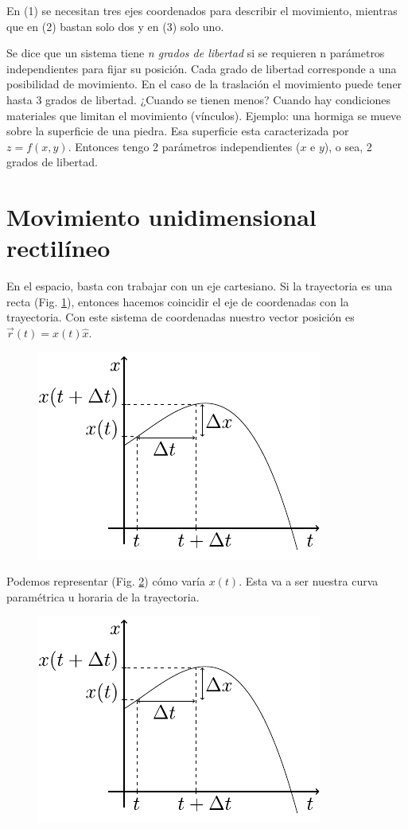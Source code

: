 En (1) se necesitan tres ejes coordenados para describir el movimiento, mientras que en (2) bastan solo dos y en (3) 
solo uno.

\para
Se dice que un sistema tiene \textit{n grados de libertad} si se requieren n parámetros independientes para fijar su 
posición. Cada grado de libertad corresponde a una posibilidad de movimiento. En el caso de la traslación el movimiento 
puede tener hasta 3 grados de libertad.
¿Cuando se tienen menos? Cuando hay condiciones materiales que limitan el movimiento (vínculos). Ejemplo: una hormiga 
se mueve sobre la superficie de una piedra. Esa superficie esta caracterizada por $z=f(x,y)$. Entonces tengo 2 
parámetros independientes ($x$ e $y$), o sea, 2 grados de libertad.

\section{Movimiento unidimensional rectilíneo}
En el espacio, basta con trabajar con un eje cartesiano. Si la trayectoria es una recta (Fig. \ref{fig:1-5}), 
entonces hacemos coincidir el eje de coordenadas con la trayectoria. Con este sistema de coordenadas nuestro vector 
posición es $\vec{r}(t) = x(t)\hat{x}$.
\begin{figure}[htbp]
  \centering
  \includegraphics[]{images/f1-6.pdf}
  \caption{}
  \label{fig:1-5}
\end{figure}

\para
Podemos representar (Fig. \ref{fig:1-6}) cómo varía $x(t)$. Esta va a ser nuestra curva paramétrica u horaria de la 
trayectoria.
\begin{figure}[htbp]
  \centering
  \includegraphics[]{images/f1-6.pdf}
  \caption{}
  \label{fig:1-6}
\end{figure}

